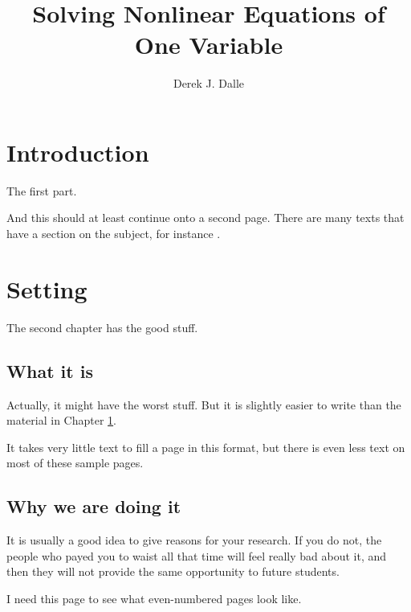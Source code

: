 \documentclass[thesis]{./tex/thesis-umich}
\title{Solving Nonlinear Equations of One Variable}
\author{Derek J. Dalle}
\begin{document}
\chapter{Introduction}   \label{chap:intro}
The first part.


\newpage

And this should at least continue onto a second page.  There are many texts that have a section on the subject, for instance \cite{chapra:2002:numerics}.

\chapter{Setting}
The second chapter has the good stuff.

\section{What it is}
Actually, it might have the worst stuff.  But it is slightly easier to write than the material in Chapter \ref{chap:intro}.

\newpage

It takes very little text to fill a page in this format, but there is even less text on most of these sample pages.

\section{Why we are doing it}
It is usually a good idea to give reasons for your research.  If you do not, the people who payed you to waist all that time will feel really bad about it, and then they will not provide the same opportunity to future students.

\newpage

I need this page to see what even-numbered pages look like.




\end{document}
